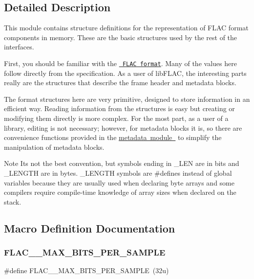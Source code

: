 \subsection{Detailed Description}
This module contains structure definitions for the representation of F\+L\+AC format components in memory. These are the basic structures used by the rest of the interfaces. 

First, you should be familiar with the \href{../format.html}{\texttt{ F\+L\+AC format}}. Many of the values here follow directly from the specification. As a user of lib\+F\+L\+AC, the interesting parts really are the structures that describe the frame header and metadata blocks.

The format structures here are very primitive, designed to store information in an efficient way. Reading information from the structures is easy but creating or modifying them directly is more complex. For the most part, as a user of a library, editing is not necessary; however, for metadata blocks it is, so there are convenience functions provided in the \mbox{\hyperlink{group__flac__metadata}{metadata module }} to simplify the manipulation of metadata blocks.

\begin{DoxyNote}{Note}
It\textquotesingle{}s not the best convention, but symbols ending in \+\_\+\+L\+EN are in bits and \+\_\+\+L\+E\+N\+G\+TH are in bytes. \+\_\+\+L\+E\+N\+G\+TH symbols are \#defines instead of global variables because they are usually used when declaring byte arrays and some compilers require compile-\/time knowledge of array sizes when declared on the stack. 
\end{DoxyNote}


\subsection{Macro Definition Documentation}
\mbox{\label{group__flac__format_gad0156d56751e80241fa349d1e25064a6}} 
\subsubsection{\texorpdfstring{FLAC\_\_MAX\_BITS\_PER\_SAMPLE}{FLAC\_\_MAX\_BITS\_PER\_SAMPLE}}
{\footnotesize\ttfamily \#define F\+L\+A\+C\+\_\+\+\_\+\+M\+A\+X\+\_\+\+B\+I\+T\+S\+\_\+\+P\+E\+R\+\_\+\+S\+A\+M\+P\+LE~(32u)}

